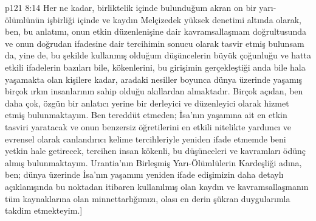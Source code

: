 \vs p121 8:14 Her ne kadar, birliktelik içinde bulunduğum akran on bir yarı\hyp{}ölümlünün işbirliği içinde ve kaydın Melçizedek yüksek denetimi altında olarak, ben, bu anlatımı, onun etkin düzenlenişine dair kavramsallaşmam doğrultusunda ve onun doğrudan ifadesine dair tercihimin sonucu olarak tasvir etmiş bulunsam da, yine de, bu şekilde kullanmış olduğum düşüncelerin büyük çoğunluğu ve hatta etkili ifadelerin bazıları bile, kökenlerini, bu girişimin gerçekleştiği anda bile hala yaşamakta olan kişilere kadar, aradaki nesiller boyunca dünya üzerinde yaşamış birçok ırkın insanlarının sahip olduğu akıllardan almaktadır. Birçok açıdan, ben daha çok, özgün bir anlatıcı yerine bir derleyici ve düzenleyici olarak hizmet etmiş bulunmaktayım. Ben tereddüt etmeden; İsa’nın yaşamına ait en etkin tasviri yaratacak ve onun benzersiz öğretilerini en etkili nitelikte yardımcı ve evrensel olarak canlandırıcı kelime tercihleriyle yeniden ifade etmemde beni yetkin hale getirecek, tercihen insan kökenli, bu düşünceleri ve kavramları ödünç almış bulunmaktayım. Urantia’nın Birleşmiş Yarı\hyp{}Ölümlülerin Kardeşliği adına, ben; dünya üzerinde İsa’nın yaşamını yeniden ifade edişimizin daha detaylı açıklanışında bu noktadan itibaren kullanılmış olan kaydın ve kavramsallaşmanın tüm kaynaklarına olan minnettarlığımızı, olası en derin şükran duygularımla takdim etmekteyim.]
